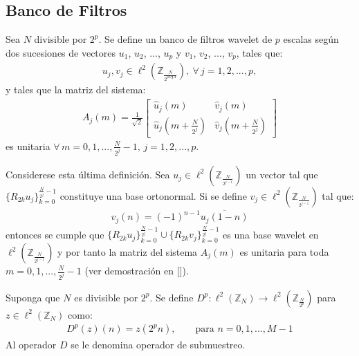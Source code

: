 \subsection{Banco de Filtros}

\begin{definition}
Sea $N$ divisible por $2^p$. Se define un banco de filtros wavelet de $p$ escalas seg\'un dos sucesiones de vectores $u_1$, $u_2$, ..., $u_p$ y $v_1$, $v_2$, ..., $v_p$, tales que:
\begin{eqnarray}
u_j, v_j \in \ell^2 \left(\mathbb{Z}_{\frac{N}{2^{par \textbf{j-1}}}}\right),~\forall\,j=1,2,...,p,\nonumber
\end{eqnarray}
y tales que la matriz del sistema:
\begin{eqnarray}
A_j(m) = \frac{1}{\sqrt{2}}\left[\begin{array}{cc}
\hat{u}_j(m)&\hat{v}_j(m)\\
\hat{u}_j\left(m+\frac{N}{2^j}\right)&\hat{v}_j\left(m+\frac{N}{2^j}\right)
\end{array}\right]\nonumber
\end{eqnarray}
es unitaria $\forall\,m=0,1,...,\frac{N}{2^j}-1,\,j=1,2,...,p$.
\label{banco-filtro}
\end{definition}

\par Considerese esta \'ultima definici\'on. Sea $u_j\in\ell^2(\mathbb{Z}_{\frac{N}{2^{j-1}}})$ un vector tal que $\{R_{2k}u_j\}_{k=0}^{\frac{N}{2^j}-1}$ constituye una base ortonormal. Si se define $v_j\in\ell^2(\mathbb{Z}_{\frac{N}{2^{j-1}}})$ tal que:
\begin{eqnarray}
v_j(n)=(-1)^{n-1}\overline{u_j(1-n)}\nonumber
\end{eqnarray}
entonces se cumple que $\{R_{2k}u_j\}_{k=0}^{\frac{N}{2^j}-1} \cup \{R_{2k}v_j\}_{k=0}^{\frac{N}{2^j}-1}$ es una base wavelet en $\ell^2(\mathbb{Z}_{\frac{N}{2^{j-1}}})$ y por tanto la matriz del sistema $A_j(m)$ es unitaria para toda $m=0,1,...,\frac{N}{2^j}-1$ (ver demostraci\'on en [\textcolor{cyan}{\cite{8}}]).\\

\begin{definition}
Suponga que $N$ es divisible por $2^p$. Se define $D^p:\ell^2(\mathbb{Z}_N)\rightarrow\ell^2(\mathbb{Z}_{\frac{N}{2^p}})$ para $z\in\ell^2(\mathbb{Z}_N)$ como:
\begin{eqnarray}
D^p(z)(n)=z(2^pn),\qquad\mbox{para $n=0,1,...,M-1$}\nonumber
\end{eqnarray}
Al operador $D$ se le denomina operador de submuestreo.
\end{definition}

